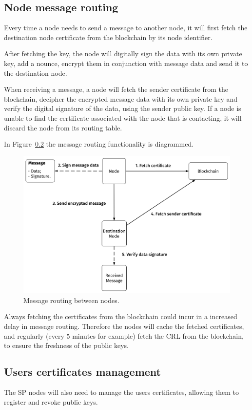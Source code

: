 {\subsection{Node message routing}
Every time a node needs to send a message to another node, it will first fetch the destination node certificate from the blockchain by its node identifier.

After fetching the key, the node will digitally sign the data with its own private key, add a nounce, encrypt them in conjunction with message data and send it to the destination node.

When receiving a message, a node will fetch the sender certificate from the blockchain, decipher the encrypted message data with its own private key and verify the digital signature of the data, using the sender public key.
If a node is unable to find the certificate associated with the node that is contacting, it will discard the node from its routing table.

In Figure~\ref{} the message routing functionality is diagrammed.

\begin{figure}
    \includegraphics[width=\linewidth]{Figures/message-routing.png}
    \caption{Message routing between nodes.}
    \label{fig:message-routing}
\end{figure}

Always fetching the certificates from the blockchain could incur in a increased delay in message routing.
Therefore the nodes will cache the fetched certificates, and regularly (every 5 minutes for example) fetch the CRL from the blockchain, to ensure the freshness of the public keys.

\subsection{Users certificates management}
The SP nodes will also need to manage the users certificates, allowing them to register and revoke public keys.

}
